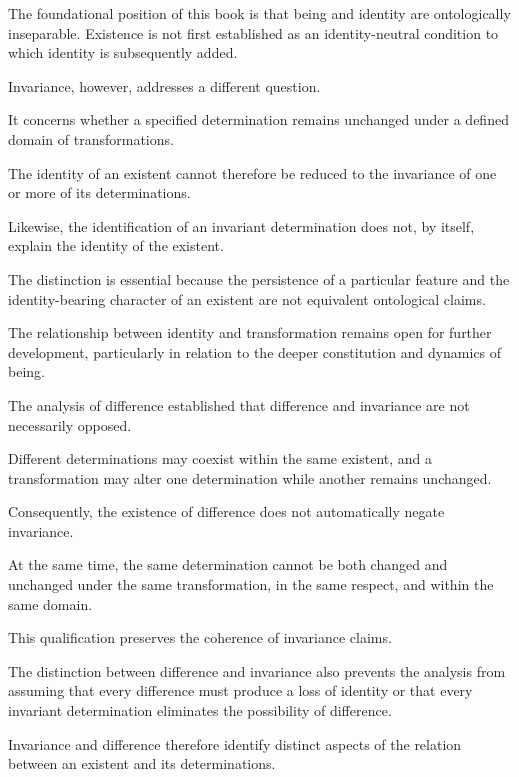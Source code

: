 The foundational position of this book is
that being and identity are ontologically
inseparable. Existence is not first established
as an identity-neutral condition to which
identity is subsequently added.

Invariance, however, addresses a different
question.

It concerns whether a specified determination
remains unchanged under a defined domain
of transformations.

The identity of an existent cannot therefore
be reduced to the invariance of one or more
of its determinations.

Likewise, the identification of an invariant
determination does not, by itself, explain
the identity of the existent.

The distinction is essential because the
persistence of a particular feature and
the identity-bearing character of an existent
are not equivalent ontological claims.

The relationship between identity and
transformation remains open for further
development, particularly in relation to
the deeper constitution and dynamics
of being.


The analysis of difference established
that difference and invariance are not
necessarily opposed.

Different determinations may coexist
within the same existent, and a transformation
may alter one determination while another
remains unchanged.

Consequently, the existence of difference
does not automatically negate invariance.

At the same time, the same determination
cannot be both changed and unchanged
under the same transformation, in the
same respect, and within the same domain.

This qualification preserves the coherence
of invariance claims.

The distinction between difference and
invariance also prevents the analysis
from assuming that every difference
must produce a loss of identity or that
every invariant determination eliminates
the possibility of difference.

Invariance and difference therefore
identify distinct aspects of the relation
between an existent and its determinations.

